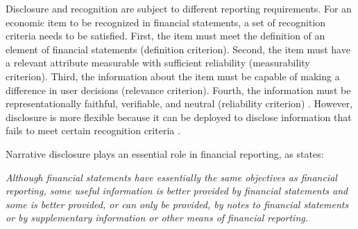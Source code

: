 \documentclass[a4paper]{article}
\begin{document}
\begin{spacing}{2}
Disclosure and recognition are subject to different reporting requirements. For an economic item to be recognized in financial statements, a set of recognition criteria needs to be satisfied. First, the item must meet the definition of an element of financial statements (definition criterion). Second, the item must have a relevant attribute measurable with sufficient reliability (measurability criterion). Third, the information about the item must be capable of making a difference in user decisions (relevance criterion). Fourth, the information must be representationally faithful, verifiable, and neutral (reliability criterion) \cite{fasbStatementFinancialAccounting1984}. However, disclosure is more flexible because it can be deployed to disclose information that fails to meet certain recognition criteria \cite[par. 7b]{fasbStatementFinancialAccounting1984}. 

Narrative disclosure plays an essential role in financial reporting, as  states:

\begin{singlespace}
	\indent \textit{Although financial statements have essentially the same objectives as financial reporting, some useful information is better provided by financial statements and some is better provided, or can only be provided, by notes to financial statements or by supplementary information or other means of financial reporting.}
\end{singlespace}


\end{spacing}
\end{document}
